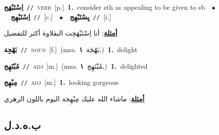 \documentclass[10pt,a4paper,twoside]{article} %
\begin{document}
\begin{multicols}{2}
{\setlength\topsep{0pt}\textbf{\foreignlanguage{arabic}{اِسْتَبْهَج}}\ {\color{gray}\texttt{//}\color{black}}\ \textsc{verb}\ [p.]\ \textbf{1.}~consider sth as appealing to be given to sb\ \ $\bullet$\ \ \setlength\topsep{0pt}\textbf{\foreignlanguage{arabic}{اِسْتَبْهِج}}\ {\color{gray}\texttt{//}\color{black}}\ [c.]\ \ $\bullet$\ \ \setlength\topsep{0pt}\textbf{\foreignlanguage{arabic}{يِسْتَبْهِج}}\ {\color{gray}\texttt{//}\color{black}}\ [i.]\  \begin{flushright}\color{gray}\foreignlanguage{arabic}{\textbf{\underline{\foreignlanguage{arabic}{أمثلة}}}: أنا اِسْتَبْهَجِت البقلاوة أكثر للتفضيل}\end{flushright}\color{black}} \vspace{2mm}

{\setlength\topsep{0pt}\textbf{\foreignlanguage{arabic}{بَهْجِة}}\ {\color{gray}\texttt{//}\color{black}}\ \textsc{noun}\ [f.]\ \color{gray}(msa. \foreignlanguage{arabic}{بَهْجَة}~\foreignlanguage{arabic}{\textbf{١.}})\color{black}\ \textbf{1.}~delight\ } \vspace{2mm}

{\setlength\topsep{0pt}\textbf{\foreignlanguage{arabic}{مُبْتَهِج}}\ {\color{gray}\texttt{//}\color{black}}\ \textsc{adj}\ [m.]\ \color{gray}(msa. \foreignlanguage{arabic}{مُبْتَهِج}~\foreignlanguage{arabic}{\textbf{١.}})\color{black}\ \textbf{1.}~delighted\ } \vspace{2mm}

{\setlength\topsep{0pt}\textbf{\foreignlanguage{arabic}{مِبْهِج}}\ {\color{gray}\texttt{//}\color{black}}\ \textsc{adj}\ [m.]\ \textbf{1.}~looking gorgeous\  \begin{flushright}\color{gray}\foreignlanguage{arabic}{\textbf{\underline{\foreignlanguage{arabic}{أمثلة}}}: ماشاء الله عليك مِبْهِجة اليوم باللون الزهري}\end{flushright}\color{black}} \vspace{2mm}

\vspace{-3mm}
\subsection*{\color{blue}\foreignlanguage{arabic}{ب.ه.د.ل}\color{blue}{}} 


\end{multicols}
\end{document}
